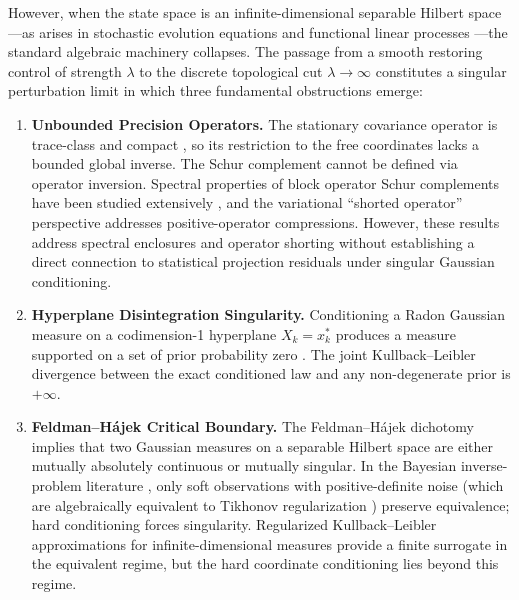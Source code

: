 \documentclass[11pt]{amsart}
\theoremstyle{plain}
\theoremstyle{definition}
\theoremstyle{remark}
\begin{document}
    However, when the state space is an infinite-dimensional separable Hilbert space---as arises in stochastic evolution equations \cite{daprato2014stochastic} and functional linear processes \cite{bosq2000linear}---the standard algebraic machinery collapses. The passage from a smooth restoring control of strength $\lambda$ to the discrete topological cut $\lambda \to \infty$ constitutes a singular perturbation limit \cite{pavliotis2008multiscale} in which three fundamental obstructions emerge:
    \begin{enumerate}
        \item \textbf{Unbounded Precision Operators.} The stationary covariance operator is trace-class and compact \cite{daprato2014stochastic}, so its restriction to the free coordinates lacks a bounded global inverse. The Schur complement cannot be defined via operator inversion. Spectral properties of block operator Schur complements have been studied extensively \cite{tretter2008spectral,gerhat2024schur}, and the variational ``shorted operator'' perspective \cite{anderson1975shorted} addresses positive-operator compressions. However, these results address spectral enclosures and operator shorting without establishing a direct connection to statistical projection residuals under singular Gaussian conditioning.
        \item \textbf{Hyperplane Disintegration Singularity.} Conditioning a Radon Gaussian measure on a codimension-1 hyperplane $X_k = x_k^*$ produces a measure supported on a set of prior probability zero \cite{bogachev1998gaussian}. The joint Kullback--Leibler divergence between the exact conditioned law and any non-degenerate prior is $+\infty$.
        \item \textbf{Feldman--H\'{a}jek Critical Boundary.} The Feldman--H\'{a}jek dichotomy \cite{feldman1958equivalence,hajek1958property,bogachev1998gaussian} implies that two Gaussian measures on a separable Hilbert space are either mutually absolutely continuous or mutually singular. In the Bayesian inverse-problem literature \cite{stuart2010inverse}, only soft observations with positive-definite noise (which are algebraically equivalent to Tikhonov regularization \cite{franklin1970well}) preserve equivalence; hard conditioning forces singularity. Regularized Kullback--Leibler approximations for infinite-dimensional measures \cite{pinski2015kullback} provide a finite surrogate in the equivalent regime, but the hard coordinate conditioning lies beyond this regime.
    \end{enumerate}
\end{document}
